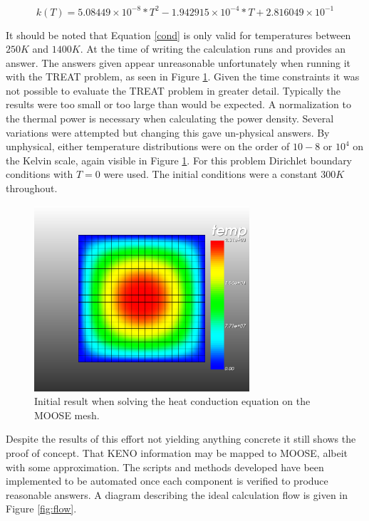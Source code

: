 \documentclass[11pt]{article}
\begin{document}
\begin{equation}
    k(T) = 5.08449 \times 10^{-8} * T^2 - 1.942915 \times 10^{-4} * T + 2.816049 \times 10^{-1}
    \label{cond}
\end{equation}

It should be noted that Equation \ref{cond} is only valid for temperatures between $250K$ and $1400K$.
At the time of writing the calculation runs and provides an answer.  The answers given appear unreasonable unfortunately when running it with the TREAT problem, as seen in Figure \ref{fig:moose-mesh}.  Given the time constraints it was not possible to evaluate the TREAT problem in greater detail.  Typically the results were too small or too large than would be expected.  A normalization to the thermal power is necessary when calculating the power density.  Several variations were attempted but changing this gave un-physical answers.  By unphysical, either temperature distributions were on the order of $10-8$ or $10^4$ on the Kelvin scale, again visible in Figure \ref{fig:moose-mesh}.  For this problem Dirichlet boundary conditions with $T=0$ were used.  The initial conditions were a constant $300K$ throughout.  

\begin{figure}[h]
    \centering
    \includegraphics[width=8cm]{figures/large-with-mesh-temp.png}
    \caption{Initial result when solving the heat conduction equation on the MOOSE mesh.}
    \label{fig:moose-mesh}
\end{figure}

Despite the results of this effort not yielding anything concrete it still shows the proof of concept.  That KENO information may be mapped to MOOSE, albeit with some approximation.  The scripts and methods developed have been implemented to be automated once each component is verified to produce reasonable answers.  A diagram describing the ideal calculation flow is given in Figure \ref{fig:flow}.
\end{document}
